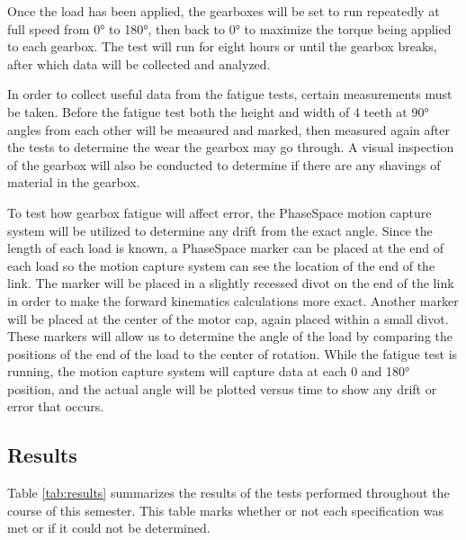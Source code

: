 Once the load has been applied, the gearboxes will be set to run repeatedly at full speed from 0° to 180°, then back to 0° to maximize the torque being applied to each gearbox. The test will run for eight hours or until the gearbox breaks, after which data will be collected and analyzed.

In order to collect useful data from the fatigue tests, certain measurements must be taken. Before the fatigue test both the height and width of 4 teeth at 90° angles from each other will be measured and marked, then measured again after the tests to determine the wear the gearbox may go through. A visual inspection of the gearbox will also be conducted to determine if there are any shavings of material in the gearbox.

To test how gearbox fatigue will affect error, the PhaseSpace motion capture system will be utilized to determine any drift from the exact angle. Since the length of each load is known, a PhaseSpace marker can be placed at the end of each load so the motion capture system can see the location of the end of the link. The marker will be placed in a slightly recessed divot on the end of the link in order to make the forward kinematics calculations more exact. Another marker will be placed at the center of the motor cap, again placed within a small divot. These markers will allow us to determine the angle of the load by comparing the positions of the end of the load to the center of rotation. While the fatigue test is running, the motion capture system will capture data at each 0 and 180° position, and the actual angle will be plotted versus time to show any drift or error that occurs.

\subsection{Results}\label{sec:conc}
Table \ref{tab:results} summarizes the results of the tests performed throughout the course of this semester. This table marks whether or not each specification was met or if it could not be determined.

